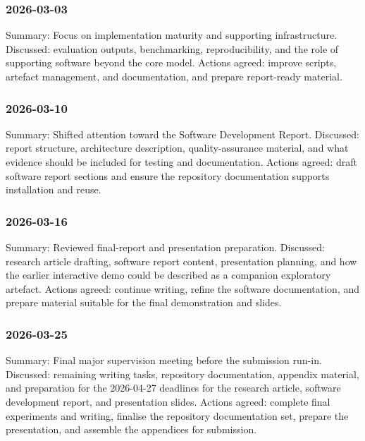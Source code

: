 ﻿\documentclass[11pt,a4paper]{article}
\begin{document}
\subsubsection*{2026-03-03}

Summary: Focus on implementation maturity and supporting infrastructure.
Discussed: evaluation outputs, benchmarking, reproducibility, and the role of
supporting software beyond the core model.
Actions agreed: improve scripts, artefact management, and documentation, and
prepare report-ready material.

\subsubsection*{2026-03-10}

Summary: Shifted attention toward the Software Development Report.
Discussed: report structure, architecture description, quality-assurance
material, and what evidence should be included for testing and documentation.
Actions agreed: draft software report sections and ensure the repository
documentation supports installation and reuse.

\subsubsection*{2026-03-16}

Summary: Reviewed final-report and presentation preparation.
Discussed: research article drafting, software report content, presentation
planning, and how the earlier interactive demo could be described as a
companion exploratory artefact.
Actions agreed: continue writing, refine the software documentation, and
prepare material suitable for the final demonstration and slides.

\subsubsection*{2026-03-25}

Summary: Final major supervision meeting before the submission run-in.
Discussed: remaining writing tasks, repository documentation, appendix
material, and preparation for the 2026-04-27 deadlines for the research
article, software development report, and presentation slides.
Actions agreed: complete final experiments and writing, finalise the repository
documentation set, prepare the presentation, and assemble the appendices for
submission.
\end{document}

